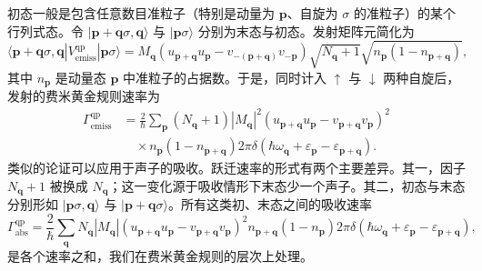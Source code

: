 初态一般是包含任意数目准粒子（特别是动量为 $\mathbf{p}$、自旋为 $\sigma$ 的准粒子）的某个行列式态。令 $|\mathbf{p}+\mathbf{q}\sigma,\mathbf{q}\rangle$ 与 $|\mathbf{p}\sigma\rangle$ 分别为末态与初态。发射矩阵元简化为
\begin{equation*}
\langle\mathbf{p}+\mathbf{q}\sigma,\mathbf{q}|V_{\mathrm{emiss}}^{\mathrm{qp}}|\mathbf{p}\sigma\rangle=M_{\mathbf{q}}\left(u_{\mathbf{p}+\mathbf{q}}u_{\mathbf{p}}-v_{-(\mathbf{p}+\mathbf{q})}v_{-\mathbf{p}}\right)\sqrt{N_{\mathbf{q}}+1}\sqrt{n_{\mathbf{p}}\left(1-n_{\mathbf{p}+\mathbf{q}}\right)},\tag{12.286}
\end{equation*}
其中 $n_{\mathbf{p}}$ 是动量态 $\mathbf{p}$ 中准粒子的占据数。于是，同时计入 $\uparrow$ 与 $\downarrow$ 两种自旋后，发射的费米黄金规则速率为
\begin{align*}
\Gamma_{\mathrm{emiss}}^{\mathrm{qp}}&=\frac{2}{\hbar}\sum_{\mathbf{p}}\left(N_{\mathbf{q}}+1\right)\left|M_{\mathbf{q}}\right|^{2}\left(u_{\mathbf{p}+\mathbf{q}}u_{\mathbf{p}}-v_{\mathbf{p}+\mathbf{q}}v_{\mathbf{p}}\right)^{2}\\
&\quad\times n_{\mathbf{p}}\left(1-n_{\mathbf{p}+\mathbf{q}}\right)2\pi\delta\left(\hbar\omega_{\mathbf{q}}+\varepsilon_{\mathbf{p}}-\varepsilon_{\mathbf{p}+\mathbf{q}}\right).\tag{12.287}
\end{align*}
类似的论证可以应用于声子的吸收。跃迁速率的形式有两个主要差异。其一，因子 $N_{\mathbf{q}}+1$ 被换成 $N_{\mathbf{q}}$；这一变化源于吸收情形下末态少一个声子。其二，初态与末态分别形如 $|\mathbf{p}\sigma,\mathbf{q}\rangle$ 与 $|\mathbf{p}+\mathbf{q}\sigma\rangle$。所有这类初、末态之间的吸收速率
\begin{equation*}
\Gamma_{\mathrm{abs}}^{\mathrm{qp}}=\frac{2}{\hbar}\sum_{\mathbf{q}}N_{\mathbf{q}}|M_{\mathbf{q}}|\left(u_{\mathbf{p}+\mathbf{q}}u_{\mathbf{p}}-v_{\mathbf{p}+\mathbf{q}}v_{\mathbf{p}}\right)^{2}n_{\mathbf{p}+\mathbf{q}}\left(1-n_{\mathbf{p}}\right)2\pi\delta\left(\hbar\omega_{\mathbf{q}}+\varepsilon_{\mathbf{p}}-\varepsilon_{\mathbf{p}+\mathbf{q}}\right),\tag{12.288}
\end{equation*}
是各个速率之和，我们在费米黄金规则的层次上处理。

